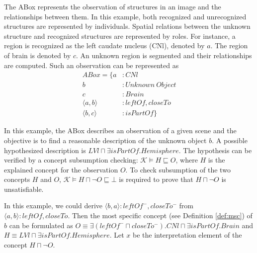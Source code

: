 \documentclass{article}
\begin{document}
The ABox represents the observation of structures in an image and the relationships between them.
In this example, both recognized and unrecognized structures are represented by individuals. Spatial relations between the unknown structure and
recognized structures are represented by roles.
For instance, a region is recognized as the left caudate nucleus (CNl), denoted by $a$.
The region of brain is denoted by $c$. An unknown region is segmented and their relationships are computed.  
Such an observation can be represented as
\begin{align*}
 ABox=\{ a&: CNl \\
	 b&: Unknown~Object \\
	 c&: Brain \\
	 \langle a,b\rangle &: leftOf, closeTo \\
	 \langle b,c\rangle &: isPartOf\}
\end{align*}

In this example, the ABox describes an observation of a given scene and the objective is to find a reasonable description of  the unknown object $b$.
A possible hypothesized description is $LVl\sqcap \exists isPartOf.Hemisphere$.
The hypothesis can be verified by a concept subsumption checking: $\mathcal{K} \vDash H\sqsubseteq O$, where $H$ is the explained concept for the observation $O$.
To check subsumption of the two concepts $H$ and $O$, $\mathcal{K} \vDash H\sqcap \neg O \sqsubseteq \bot$ is required to prove that $H\sqcap \neg O$ is unsatisfiable.

In this example, we could derive $\langle b,a\rangle:leftOf^-,closeTo^-$ from $\langle a,b\rangle:leftOf,closeTo$.
Then the most specific concept (see Definition \ref{def:msc}) of  $b$ can be formulated as $O\equiv \exists (leftOf^-\sqcap closeTo^-). CNl\sqcap \exists isPartOf.Brain$ and $H\equiv LVl\sqcap \exists isPartOf.Hemisphere$.
Let $x$ be the interpretation element of the concept $H\sqcap \neg O$. 
\end{document}
